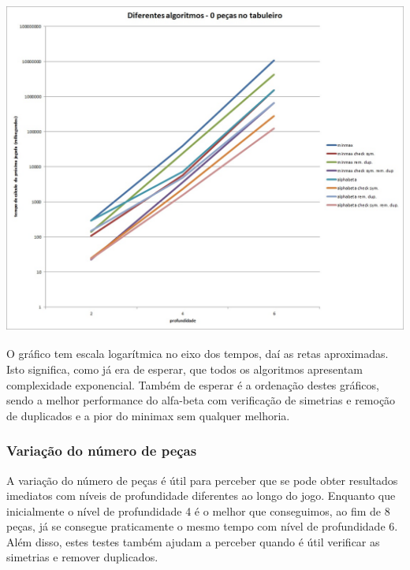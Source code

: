 \begin{table}[H]
\centering
\includegraphics[height=11cm]{performance/tempP0depthComparison.jpg}
\end{table}

O gráfico tem escala logarítmica no eixo dos tempos, daí as retas aproximadas. Isto significa, como já era de esperar, que todos os algoritmos apresentam complexidade exponencial. Também de esperar é a ordenação destes gráficos, sendo a melhor performance do alfa-beta com verificação de simetrias e remoção de duplicados e a pior do minimax sem qualquer melhoria.

\subsubsection{Variação do número de peças}

A variação do número de peças é útil para perceber que se pode obter resultados imediatos com níveis de profundidade diferentes ao longo do jogo. Enquanto que inicialmente o nível de profundidade 4 é o melhor que conseguimos, ao fim de 8 peças, já se consegue praticamente o mesmo tempo com nível de profundidade 6. Além disso, estes testes também ajudam a perceber quando é útil verificar as simetrias e remover duplicados.

